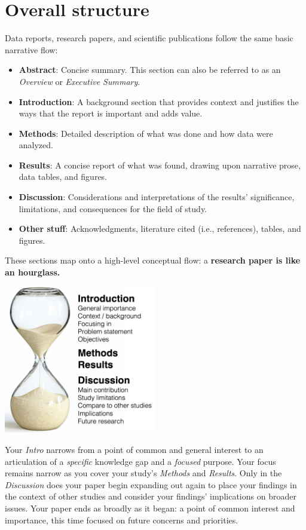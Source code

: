 \documentclass[
]{book}
\providecommand{\tightlist}{%
  \setlength{\itemsep}{0pt}\setlength{\parskip}{0pt}}
\begin{document}
\hypertarget{overall-structure}{%
\section*{Overall structure}\label{overall-structure}}

Data reports, research papers, and scientific publications follow the same basic narrative flow:

\begin{itemize}
\tightlist
\item
  \textbf{Abstract}: Concise summary. This section can also be referred to as an \emph{Overview} or \emph{Executive Summary}.
\item
  \textbf{Introduction}: A background section that provides context and justifies the ways that the report is important and adds value.\\
\item
  \textbf{Methods}: Detailed description of what was done and how data were analyzed.\\
\item
  \textbf{Results}: A concise report of what was found, drawing upon narrative prose, data tables, and figures.
\item
  \textbf{Discussion}: Considerations and interpretations of the results' significance, limitations, and consequences for the field of study.
\item
  \textbf{Other stuff}: Acknowledgments, literature cited (i.e., references), tables, and figures.
\end{itemize}

These sections map onto a high-level conceptual flow: a \textbf{research paper is like an hourglass.}

\includegraphics[width=0.5\textwidth,height=\textheight]{img/hourglass.png}

Your \emph{Intro} narrows from a point of common and general interest to an articulation of a \emph{specific} knowledge gap and a \emph{focused} purpose. Your focus remains narrow as you cover your study's \emph{Methods} and \emph{Results}. Only in the \emph{Discussion} does your paper begin expanding out again to place your findings in the context of other studies and consider your findings' implications on broader issues. Your paper ends as broadly as it began: a point of common interest and importance, this time focused on future concerns and priorities.
\end{document}
